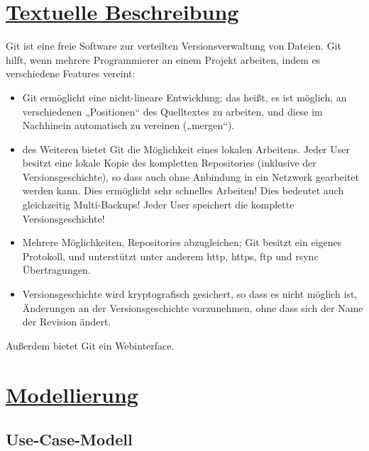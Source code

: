 \documentclass[a4paper]{article}
\begin{document}
\section{\underline{Textuelle Beschreibung}}

Git ist eine freie Software zur verteilten Versionsverwaltung von Dateien. Git hilft, wenn mehrere Programmierer an einem Projekt arbeiten, indem es verschiedene Features vereint:

  \begin{itemize} 										%
     
\item Git ermöglicht eine nicht-lineare Entwicklung; das heißt, es ist möglich, an verschiedenen „Positionen“ des Quelltextes zu arbeiten, und diese im Nachhinein automatisch zu vereinen („mergen“). %
\item des Weiteren bietet Git die Möglichkeit eines lokalen Arbeitens. Jeder User besitzt eine lokale Kopie des kompletten Repositories (inklusive der Versionsgeschichte), so dass auch ohne Anbindung in ein Netzwerk gearbeitet werden kann. Dies ermöglicht sehr schnelles Arbeiten!
Dies bedeutet auch gleichzeitig Multi-Backups! Jeder User speichert die komplette Versionsgeschichte!
\item Mehrere Möglichkeiten, Repositories abzugleichen; Git besitzt ein eigenes Protokoll, und unterstützt unter anderem http, https, ftp und rsync Übertragungen.
\item Versionsgeschichte wird kryptografisch gesichert, so dass es nicht möglich ist, Änderungen an der Versionsgeschichte vorzunehmen, ohne dass sich der Name der Revision ändert.

    \end{itemize} 										%

Außerdem bietet Git ein Webinterface.

\section{\underline{Modellierung}}

\subsection{Use-Case-Modell}
\end{document}
